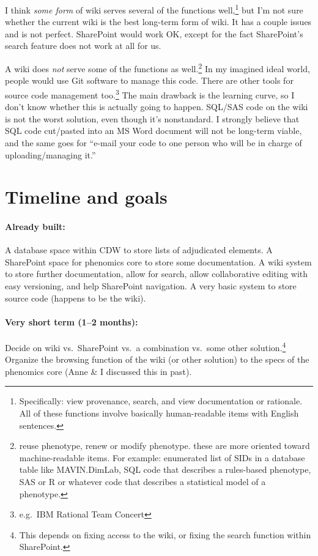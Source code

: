 \documentclass{tufte-handout}
\begin{document}
I think \emph{some form} of wiki serves several of the functions
well,\footnote{Specifically: view provenance, search, and view
  documentation or rationale. All of these functions involve basically
  human-readable items with English sentences.} but I'm not sure
whether the current wiki is the best long-term form of wiki. It has a
couple issues and is not perfect. SharePoint would work OK, except for
the fact SharePoint's search feature does not work at all for us.

A wiki does \emph{not} serve some of the functions as
well.\footnote{reuse phenotype, renew or modify phenotype. these are
  more oriented toward machine-readable items. For example: enumerated
  list of SIDs in a database table like MAVIN.DimLab, SQL code that
  describes a rules-based phenotype, SAS or R or whatever code that
  describes a statistical model of a phenotype.} In my imagined ideal
world, people would use Git software to manage this code. There are
other tools for source code management too.\footnote{e.g.\ IBM
  Rational Team Concert} The main drawback is the learning curve, so I
don't know whether this is actually going to happen. SQL/SAS code on
the wiki is not the worst solution, even though it's nonstandard. I
strongly believe that SQL code cut/pasted into an MS Word document
will not be long-term viable, and the same goes for ``e-mail your code
to one person who will be in charge of uploading/managing it.''

\section{Timeline and goals}

\paragraph{Already built:} A database space within CDW to store lists
of adjudicated elements. A SharePoint space for phenomics core to store
some documentation. A wiki system to store further documentation, allow
for search, allow collaborative editing with easy versioning, and help
SharePoint navigation. A very basic system to store source code (happens
to be the wiki).

\paragraph{Very short term (1--2 months):} Decide on wiki vs.\ SharePoint
vs.\ a combination vs.\ some other solution.\footnote{This depends on fixing access
  to the wiki, or fixing the search function within SharePoint.} Organize the browsing
function of the wiki (or other solution) to the specs of the phenomics
core (Anne \& I discussed this in past).
\end{document}
